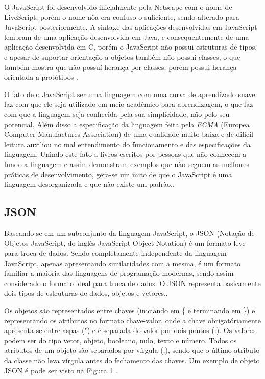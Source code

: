 O JavaScript foi desenvolvido inicialmente pela Netscape com o nome de LiveScript, porém o nome nõa era confuso o suficiente, sendo alterado para JavaScript posteriormente. A sintaxe das aplicações desenvolvidas em JavaScript lembram de uma aplicação desenvolvida em Java, e consequentemente de uma aplicação desenvolvida em C, porém o JavaScript não possui estruturas de tipos, e apesar de suportar orientação a objetos também não possui classes, o que também mostra que não possuí herança por classes, porém possui herança orientada a protótipos \cite{JavaScriptCrockford}.

O fato de o JavaScript ser uma linguagem com uma curva de aprendizado suave faz com que ele seja utilizado em meio acadêmico para aprendizagem, o que faz com que a linguagem seja conhecida pela sua simplicidade, não pelo seu potencial. Além disso a especificação da linguagem feita pela \emph{ECMA} (Europea Computer Manufactures Association) de uma qualidade muito baixa e de dificil leitura auxiliou no mal entendimento do funcionamento e das especificações da linguagem. Unindo este fato a livros escritos por pessoas que não conhecem a fundo a linguagem e assim demonstram exemplos que não seguem as melhores práticas de desenvolvimento, gera-se um mito de que o JavaScript é uma linguagem desorganizada e que não existe um padrão.\cite{JavaScriptCrockford}.

\subsection{JSON}
Baseando-se em um subconjunto da linguagem JavaScript, o JSON (Notação de Objetos JavaScript, do inglês JavaScript Object Notation) é um formato leve para troca de dados. Sendo completamente independente da linguagem JavaScript, apenas apresentando similaridades com a mesma, é um formato familiar a maioria das linguagens de programação modernas, sendo assim considerado o formato ideal para troca de dados. O JSON representa basicamente dois tipos de estruturas de dados, objetos e vetores.\cite{JSON}.

Os objetos são representados entre chaves (iniciando em \{ e terminando em \}) e representando os atributos no formato chave-valor, onde a chave obrigatóriamente apresenta-se entre aspas (") e é separada do valor por dois-pontos (:). Os valores podem ser do tipo vetor, objeto, booleano, nulo, texto e número. Todos os atributos de um objeto são separados por vírgula (,), sendo que o último atributo da classe não leva vírgula antes do fechamento das chaves. Um exemplo de objeto JSON é pode ser visto na Figura 1 \cite{JSON}.

